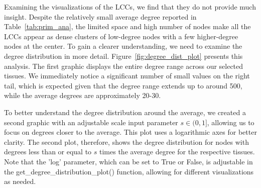 \documentclass[paper=a4,fontsize=11pt,DIV=8,BCOR=5mm,oneside,pdftex,bibtotocnumbered]{scrreprt}
\theoremstyle{plain}
\begin{document}
	Examining the visualizations of the LCCs, we find that they do not provide much insight. Despite the relatively small average degree reported in Table~\ref{tab:prim_ana}, the limited space and high number of nodes make all the LCCs appear as dense clusters of low-degree nodes with a few higher-degree nodes at the center. To gain a clearer understanding, we need to examine the degree distribution in more detail. Figure~\ref{fig:degree_dist_plot} presents this analysis. The first graphic displays the entire degree range across our selected tissues. We immediately notice a significant number of small values on the right tail, which is expected given that the degree range extends up to around 500, while the average degrees are approximately 20-30.
	
	To better understand the degree distribution around the average, we created a second graphic with an adjustable scale input parameter $s\in (0, 1]$, allowing us to focus on degrees closer to the average. This plot uses a logarithmic axes for better clarity. The second plot, therefore, shows the degree distribution for nodes with degrees less than or equal to $s$ times the average degree for the respective tissues. Note that the 'log' parameter, which can be set to True or False, is adjustable in the get\_degree\_distribution\_plot() function, allowing for different visualizations as needed.
	
\end{document}
